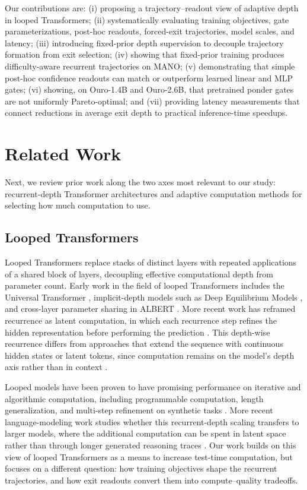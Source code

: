 \documentclass[10pt]{article} %
\begin{document}
Our contributions are:
(i) proposing a trajectory--readout view of adaptive depth in looped Transformers;
(ii) systematically evaluating training objectives, gate parameterizations, post-hoc readouts, forced-exit trajectories, model scales, and latency;
(iii) introducing fixed-prior depth supervision to decouple trajectory formation from exit selection;
(iv) showing that fixed-prior training produces difficulty-aware recurrent trajectories on MANO;
(v) demonstrating that simple post-hoc confidence readouts can match or outperform learned linear and MLP gates;
(vi) showing, on Ouro-1.4B and Ouro-2.6B, that pretrained ponder gates are not uniformly Pareto-optimal; and
(vii) providing latency measurements that connect reductions in average exit depth to practical inference-time speedups.

\section{Related Work}

Next, we review prior work along the two axes most relevant to our study: recurrent-depth Transformer architectures and adaptive computation methods for selecting how much computation to use.

\subsection{Looped Transformers}
Looped Transformers replace stacks of distinct layers with repeated applications of a shared block of layers, decoupling effective computational depth from parameter count. Early work in the field of looped Transformers includes the Universal Transformer \citep{UT}, implicit-depth models such as Deep Equilibrium Models \citep{bai2019deepequilibriummodels}, and cross-layer parameter sharing in ALBERT \citep{albert}. More recent work has reframed recurrence as latent computation, in which each recurrence step refines the hidden representation before performing the prediction \citep{reasoninglatentthoughtspower,Huginn,Ouro,loopformer}. This depth-wise recurrence differs from approaches that extend the sequence with continuous hidden states or latent tokens, since computation remains on the model's depth axis rather than in context \citep{coconut,zelikman2024quietstarlanguagemodelsteach,huang2025fastquietstarthinkingthought}.

Looped models have been proven to have promising performance on iterative and algorithmic computation, including programmable computation, length generalization, and multi-step refinement on synthetic tasks \citep{loopedtransformersprogrammablecomputers,anil2022exploringlengthgeneralizationlarge,yang2024loopedtransformersbetterlearning,kohli2026loopthinkgeneralize}. More recent language-modeling work studies whether this recurrent-depth scaling transfers to larger models, where the additional computation can be spent in latent space rather than through longer generated reasoning traces \citep{Huginn,Ouro,loopformer}. Our work builds on this view of looped Transformers as a means to increase test-time computation, but focuses on a different question: how training objectives shape the recurrent trajectories, and how exit readouts convert them into compute--quality tradeoffs.
\end{document}
